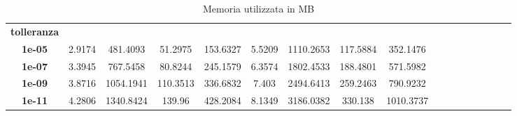 \begin{table}[!ht]
\begin{subtable}[!ht]{1\textwidth}
{\begin{tabular}{|c|c|c|c|c|c|c|c|c|c|c|c|c|c|c|c|c|}
                \textbf{tolleranza} & ~                 & ~                 & ~             & ~             & ~                 & ~                 & ~             & ~             \\
                \textbf{1e-05}      & 2.9174            & 481.4093          & 51.2975       & 153.6327      & 5.5209            & 1110.2653         & 117.5884      & 352.1476      \\
                \textbf{1e-07}      & 3.3945            & 767.5458          & 80.8244       & 245.1579      & 6.3574            & 1802.4533         & 188.4801      & 571.5982      \\
                \textbf{1e-09}      & 3.8716            & 1054.1941         & 110.3513      & 336.6832      & 7.403             & 2494.6413         & 259.2463      & 790.9232      \\
                \textbf{1e-11}      & 4.2806            & 1340.8424         & 139.96        & 428.2084      & 8.1349            & 3186.0382         & 330.138       & 1010.3737     \\
            \end{tabular}
        }
        \caption{Vem 1 e Vem 2}
        \label{tab:vem_mem}
    \end{subtable}
    \caption{Memoria utilizzata in MB}
    \label{tab:memory}
\end{table}


